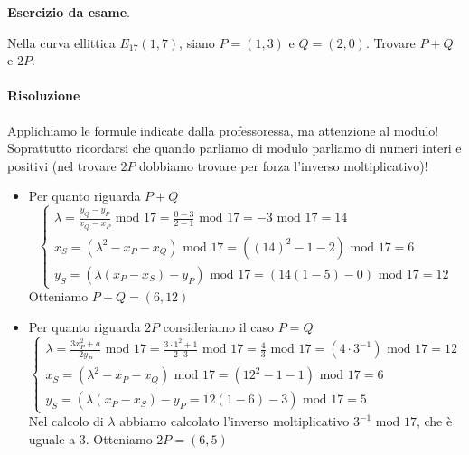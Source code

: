 \begin{framed}
	\noindent \textbf{Esercizio da esame}.
	
	\noindent Nella curva ellittica $E_{17}(1, 7)$, siano $P = (1, 3)$ e $Q = (2, 0)$. Trovare $P + Q$ e $2P$.
	
	\paragraph{Risoluzione} Applichiamo le formule indicate dalla professoressa, ma attenzione al modulo! Soprattutto ricordarsi che quando parliamo di modulo parliamo di numeri interi e positivi (nel trovare $2P$ dobbiamo trovare per forza l'inverso moltiplicativo)!
	\begin{itemize}
		\item Per quanto riguarda $P+Q$
		\[\begin{cases}
			\lambda=\frac{y_Q-y_P}{x_Q-x_P} \text{ mod } 17=\frac{0-3}{2-1}\text{ mod } 17=-3\text{ mod } 17=14\\
			x_S=\left(\lambda^2-x_P-x_Q\right)\text{ mod } 17=\left((14)^2-1-2\right)\text{ mod } 17=6\\
			y_S=\left(\lambda(x_P-x_S)-y_P\right)\text{ mod } 17=\left(14(1-5)-0\right)\text{ mod } 17=12
		\end{cases}	\]
		Otteniamo $P+Q=(6,12)$
		\item Per quanto riguarda $2P$ consideriamo il caso $P=Q$
		\[\begin{cases}
			\lambda=\frac{3x_P^2+a}{2y_P} \text{ mod } 17=\frac{3\cdot 1^2+1}{2\cdot 3}\text{ mod } 17=\frac{4}{3} \text{ mod } 17 = \left(4\cdot 3^{-1} \right) \text{ mod } 17=12\\
			x_S=(\lambda^2-x_P-x_Q) \text{ mod }17=\left({12}^2-1-1\right) \text{ mod }17= 6\\
			y_S=\left(\lambda(x_P-x_S)-y_P=12(1-6)-3\right) \text{ mod } 17=5
		\end{cases}\]
	Nel calcolo di $\lambda$ abbiamo calcolato l'inverso moltiplicativo $3^{-1} \text{ mod }17$, che è uguale a $3$. Otteniamo $2P=(6,5)$
	\end{itemize}
	
\end{framed} 


